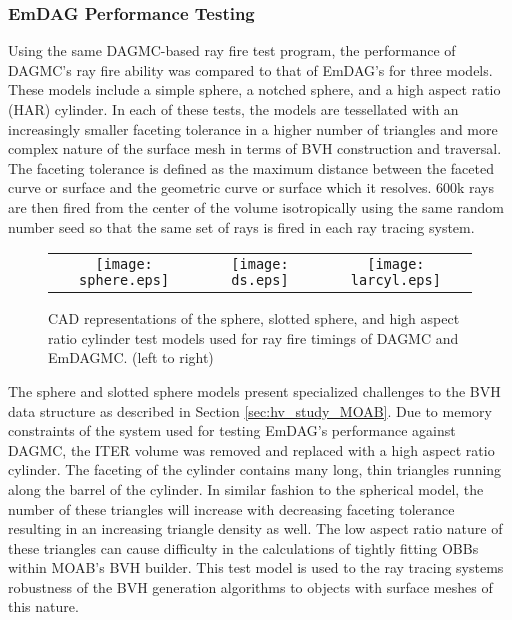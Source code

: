 \subsubsection{EmDAG Performance Testing}\label{subsubsec:emdag_rf_performance}

Using the same DAGMC-based ray fire test program, the performance of DAGMC's ray
fire ability was compared to that of EmDAG's for three models. These models
include a simple sphere, a notched sphere, and a high aspect ratio (HAR)
cylinder. In each of these tests, the models are tessellated with an
increasingly smaller faceting tolerance in a higher number of triangles and more
complex nature of the surface mesh in terms of BVH construction and
traversal. The faceting tolerance is defined as the maximum distance between the
faceted curve or surface and the geometric curve or surface which it
resolves. 600k rays are then fired from the center of the volume isotropically
using the same random number seed so that the same set of rays is fired in each
ray tracing system.

\begin{figure}[H]
  \begin{center}
    \begin{tabular}{ccc}
      \texttt{[image: sphere.eps]} &
      \texttt{[image: ds.eps]} &
      \texttt{[image: larcyl.eps]} \\
    \end{tabular}
    \caption{CAD representations of the sphere, slotted sphere, and high aspect
      ratio cylinder test models used for ray fire timings of DAGMC and
      EmDAGMC. (left to right) \label{models}}
  \end{center}
\end{figure} 

The sphere and slotted sphere models present specialized challenges to the BVH
data structure as described in Section \ref{sec:hv_study_MOAB}. Due to memory constraints
of the system used for testing EmDAG's performance against DAGMC, the ITER
volume was removed and replaced with a high aspect ratio cylinder. The faceting
of the cylinder contains many long, thin triangles running along the barrel of
the cylinder. In similar fashion to the spherical model, the number of these
triangles will increase with decreasing faceting tolerance resulting in an
increasing triangle density as well. The low aspect ratio nature of these
triangles can cause difficulty in the calculations of tightly fitting OBBs
within MOAB's BVH builder. This test model is used to the ray tracing systems
robustness of the BVH generation algorithms to objects with surface meshes of
this nature.

